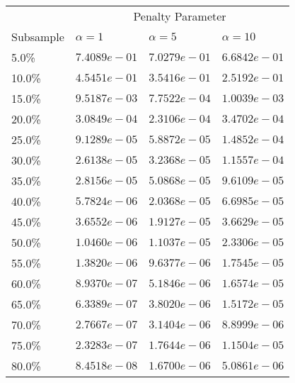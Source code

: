 \begin{tabular}{l|l|l|l}
    & \multicolumn{3}{c}{Penalty Parameter} \\
    Subsample & $\alpha=1$ & $\alpha=5$ & $\alpha=10$ \\
    \hline
    5.0\% & $7.4089e-01$ & $7.0279e-01$ & $6.6842e-01$ \\
    10.0\% & $4.5451e-01$ & $3.5416e-01$ & $2.5192e-01$ \\
    15.0\% & $9.5187e-03$ & $7.7522e-04$ & $1.0039e-03$ \\
    20.0\% & $3.0849e-04$ & $2.3106e-04$ & $3.4702e-04$ \\
    25.0\% & $9.1289e-05$ & $5.8872e-05$ & $1.4852e-04$ \\
    30.0\% & $2.6138e-05$ & $3.2368e-05$ & $1.1557e-04$ \\
    35.0\% & $2.8156e-05$ & $5.0868e-05$ & $9.6109e-05$ \\
    40.0\% & $5.7824e-06$ & $2.0368e-05$ & $6.6985e-05$ \\
    45.0\% & $3.6552e-06$ & $1.9127e-05$ & $3.6629e-05$ \\
    50.0\% & $1.0460e-06$ & $1.1037e-05$ & $2.3306e-05$ \\
    55.0\% & $1.3820e-06$ & $9.6377e-06$ & $1.7545e-05$ \\
    60.0\% & $8.9370e-07$ & $5.1846e-06$ & $1.6574e-05$ \\
    65.0\% & $6.3389e-07$ & $3.8020e-06$ & $1.5172e-05$ \\
    70.0\% & $2.7667e-07$ & $3.1404e-06$ & $8.8999e-06$ \\
    75.0\% & $2.3283e-07$ & $1.7644e-06$ & $1.1504e-05$ \\
    80.0\% & $8.4518e-08$ & $1.6700e-06$ & $5.0861e-06$ \\
\end{tabular}